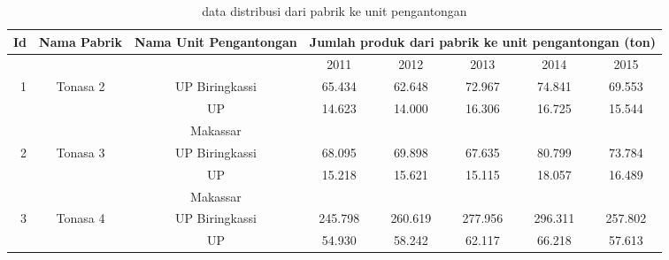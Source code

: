 \documentclass{article}
\begin{document}
\begin{table}[h]
	\caption{data distribusi dari pabrik ke unit pengantongan}	
	\begin{tabular}{|r|c|c|c|c|c|c|c|}
		\hline
		\multicolumn{ 1}{|r|}{Id} & \multicolumn{ 1}{|c|}{Nama Pabrik} & \multicolumn{ 1}{|c|}{Nama Unit Pengantongan} & \multicolumn{ 5}{|c|}{Jumlah produk dari pabrik ke unit pengantongan (ton)} \\
		\hline
		\multicolumn{ 1}{|r|}{} & \multicolumn{ 1}{|c|}{} & \multicolumn{ 1}{|c|}{} &       2011 &       2012 &       2013 &       2014 &       2015 \\
		\hline
		\multicolumn{ 1}{|r|}{1} & \multicolumn{ 1}{|c|}{Tonasa 2} & UP Biringkassi &     65.434 &     62.648 &     72.967 &     74.841 &     69.553 \\
		\hline
		\multicolumn{ 1}{|r|}{} & \multicolumn{ 1}{|c|}{} &        UP  & \multicolumn{ 1}{|c|}{14.623} & \multicolumn{ 1}{|c|}{14.000} & \multicolumn{ 1}{|c|}{16.306} & \multicolumn{ 1}{|c|}{16.725} & \multicolumn{ 1}{|c|}{15.544} \\
		\hline
		\multicolumn{ 1}{|r|}{} & \multicolumn{ 1}{|c|}{} &   Makassar & \multicolumn{ 1}{|c|}{} & \multicolumn{ 1}{|c|}{} & \multicolumn{ 1}{|c|}{} & \multicolumn{ 1}{|c|}{} & \multicolumn{ 1}{|c|}{} \\
		\hline
		\multicolumn{ 1}{|r|}{2} & \multicolumn{ 1}{|c|}{Tonasa 3} & UP Biringkassi &     68.095 &     69.898 &     67.635 &     80.799 &     73.784 \\
		\hline
		\multicolumn{ 1}{|r|}{} & \multicolumn{ 1}{|c|}{} &        UP  & \multicolumn{ 1}{|c|}{15.218} & \multicolumn{ 1}{|c|}{15.621} & \multicolumn{ 1}{|c|}{15.115} & \multicolumn{ 1}{|c|}{18.057} & \multicolumn{ 1}{|c|}{16.489} \\
		\hline
		\multicolumn{ 1}{|r|}{} & \multicolumn{ 1}{|c|}{} &   Makassar & \multicolumn{ 1}{|c|}{} & \multicolumn{ 1}{|c|}{} & \multicolumn{ 1}{|c|}{} & \multicolumn{ 1}{|c|}{} & \multicolumn{ 1}{|c|}{} \\
		\hline
		\multicolumn{ 1}{|r|}{3} & \multicolumn{ 1}{|c|}{Tonasa 4} & UP Biringkassi &    245.798 &    260.619 &    277.956 &    296.311 &    257.802 \\
		\hline
		\multicolumn{ 1}{|r|}{} & \multicolumn{ 1}{|c|}{} &        UP  & \multicolumn{ 1}{|c|}{54.930} & \multicolumn{ 1}{|c|}{58.242} & \multicolumn{ 1}{|c|}{62.117} & \multicolumn{ 1}{|c|}{66.218} & \multicolumn{ 1}{|c|}{57.613} \\

\end{tabular}
\end{table}
\end{document}
